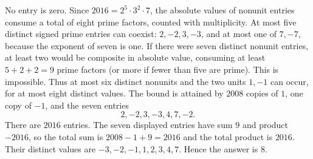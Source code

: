 No entry is zero. Since $2016=2^5\cdot3^2\cdot7$, the absolute values of nonunit entries consume a total of eight prime factors, counted with multiplicity. At most five distinct signed prime entries can coexist: $2,-2,3,-3$, and at most one of $7,-7$, because the exponent of seven is one. If there were seven distinct nonunit entries, at least two would be composite in absolute value, consuming at least $5+2+2=9$ prime factors (or more if fewer than five are prime). This is impossible. Thus at most six distinct nonunits and the two units $1,-1$ can occur, for at most eight distinct values.
The bound is attained by $2008$ copies of $1$, one copy of $-1$, and the seven entries
\[2,-2,3,-3,4,7,-2.\]
There are $2016$ entries. The seven displayed entries have sum $9$ and product $-2016$, so the total sum is $2008-1+9=2016$ and the total product is $2016$. Their distinct values are $-3,-2,-1,1,2,3,4,7$. Hence the answer is $\boxed8$.
